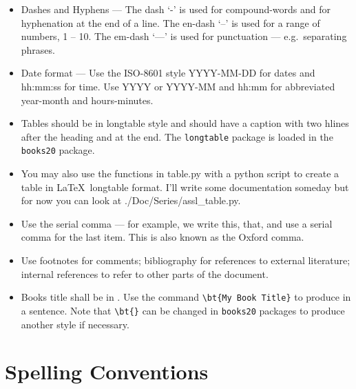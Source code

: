 
\begin{itemize}

\item Dashes and Hyphens --- The dash `-' is used for compound-words and for
  hyphenation at the end of a line.  The en-dash `--' is used for a range
  of numbers, 1 -- 10. The em-dash `---' is used for punctuation ---
  e.g.\ separating phrases.

\item Date format --- Use the ISO-8601 \cite{isotime} style
  YYYY-MM-DD for dates and hh:mm:ss for time. Use YYYY or YYYY-MM
  and hh:mm for abbreviated year-month and hours-minutes.

\item Tables should be in longtable style and should have a caption
  with two hlines after the heading and at the end. The
  \texttt{longtable} \cite{Carlisle2014} package is loaded in the \texttt{books20}
  package.

\item You may also use the functions in table.py with a python script to create
  a table in \LaTeX\ longtable format.  I'll write some documentation someday
  but for now you can look at ./Doc/Series/assl\_table.py.

\item Use the serial comma --- for example, we write this, that, and
  use a serial comma for the last item. This is also known as the Oxford
  comma.

\item Use footnotes for comments; bibliography for references to
  external literature; internal references to refer to other parts of
  the document.

\item Books title shall be in . Use the command
  \verb|\bt{My Book Title}| to produce  in a
  sentence. Note that \verb|\bt{}| can be changed in \texttt{books20}
  packages to produce another style if necessary.

\end{itemize}

\section{Spelling Conventions}

